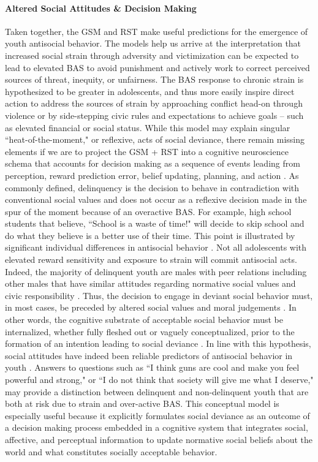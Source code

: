 \documentclass[utf8]{article}
\begin{document}
\paragraph{Altered Social Attitudes \& Decision Making} Taken together, the GSM and RST make useful predictions for the emergence of youth antisocial behavior. The models help us arrive at the interpretation that increased social strain through adversity and victimization can be expected to lead to elevated BAS to avoid punishment and actively work to correct perceived sources of threat, inequity, or unfairness. The BAS response to chronic strain is hypothesized to be greater in adolescents, and thus more easily inspire direct action to address the sources of strain by approaching conflict head-on through violence or by side-stepping civic rules and expectations to achieve goals -- such as elevated financial or social status. While this model may explain singular  ``heat-of-the-moment," or reflexive, acts of social deviance, there remain missing elements if we are to project the GSM + RST into a cognitive neuroscience schema that accounts for decision making as a sequence of events leading from perception, reward prediction error, belief updating, planning, and action \citep{cosmides1997dissecting,cosmides2000socialreason,van2010interpersonal}. As commonly defined, delinquency is the decision to behave in contradiction with conventional social values and does not occur as a reflexive decision made in the spur of the moment because of an overactive BAS. For example, high school students that believe, ``School is a waste of time!" will decide to skip school and do what they believe is a better use of their time. This point is illustrated by significant individual differences in antisocial behavior \citep{mazerolle1998gender}. Not all adolescents with elevated reward sensitivity and exposure to strain will commit antisocial acts. Indeed, the majority of delinquent youth are males with peer relations including other males that have similar attitudes regarding normative social values and civic responsibility \citep{mears1998explaining}. Thus, the decision to engage in deviant social behavior must, in most cases, be preceded by altered social values and moral judgements \citep{stams2006moral}. In other words, the cognitive substrate of acceptable social behavior must be internalized, whether fully fleshed out or vaguely conceptualized, prior to the formation of an intention leading to social deviance \citep{pogarsky2018offender}. In line with this hypothesis, social attitudes have indeed been reliable predictors of antisocial behavior in youth \citep{tarry2007attitudes}. Answers to questions such as ``I think guns are cool and make you feel powerful and strong," or ``I do not think that society will give me what I deserve," may provide a distinction between delinquent and non-delinquent youth that are both at risk due to strain and over-active BAS. This conceptual model is especially useful because it explicitly formulates social deviance as an outcome of a decision making process embedded in a cognitive system that integrates social, affective, and perceptual information to update normative social beliefs about the world and what constitutes socially acceptable behavior.
\end{document}
